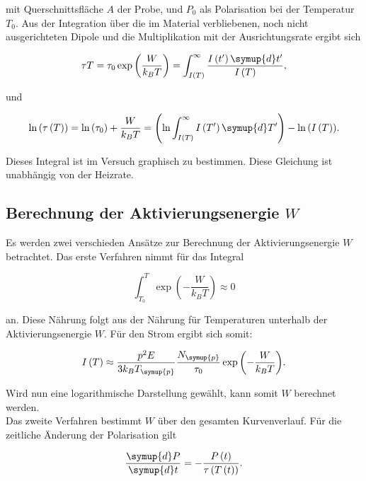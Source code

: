 mit Querschnittsfläche $A$ der Probe, und $P_0$ als Polarisation bei der Temperatur $T_0$. Aus der Integration über die im Material 
verbliebenen, noch nicht ausgerichteten Dipole und die Multiplikation mit der Ausrichtungsrate ergibt sich 

\begin{equation*}
    \tau{T} = \tau_0 \exp{\left(\frac{W}{k_B T}\right)} = \int_{I\left(T\right)}^{\infty} \frac{I\left(t'\right)\symup{d}t'}{I\left(T\right)},
\end{equation*}

und 

\begin{equation*}
    \ln{\left(\tau\left(T\right)\right)} = \ln{\left(\tau_0\right)} + \frac{W}{k_B T} = \left(\ln{\int_{I\left(T\right)}^{\infty}I\left(T'\right)\symup{d}T'}\right)-\ln{\left(I\left(T\right)\right)}.
\end{equation*}

Dieses Integral ist im Versuch graphisch zu bestimmen. Diese Gleichung ist unabhängig von der Heizrate.

\subsection{Berechnung der Aktivierungsenergie $W$}

Es werden zwei verschieden Ansätze zur Berechnung der Aktivierungsenergie $W$ betrachtet. Das erste Verfahren nimmt für das Integral

\begin{equation*}
    \int_{T_0}^T \exp{\left(-\frac{W}{k_B T}\right)} \approx 0
\end{equation*}

an. Diese Nährung folgt aus der Nährung für Temperaturen unterhalb der Aktivierungsenergie $W$. Für den Strom ergibt sich somit: 

\begin{equation*}
    I\left(T\right) \approx \frac{p^2 E}{3 k_B T_{\symup{p}}}\frac{N_{\symup{p}}}{\tau_0}\exp{\left(-\frac{W}{k_B T}\right)}.
\end{equation*}

Wird nun eine logarithmische Darstellung gewählt, kann somit $W$ berechnet werden. \\
Das zweite Verfahren bestimmt $W$ über den gesamten Kurvenverlauf. Für die zeitliche Änderung der Polarisation gilt

\begin{equation*}
    \frac{\symup{d}P}{\symup{d}t} = -\frac{P\left(t\right)}{\tau\left(T\left(t\right)\right)}.
\end{equation*}

